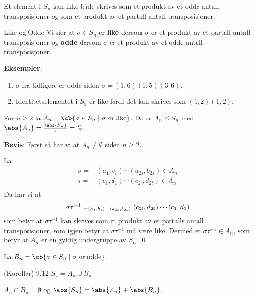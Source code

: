 \begin{theorem*}{9.15}{}
  Et element i $S_n$ kan ikke både skrives som et produkt av et odde antall transposisjoner og
  som et produkt av et partall antall transposisjoner.
\end{theorem*}

\begin{definition}{Like og Odde}{}
  Vi sier at $\sigma\in S_n$ er \textbf{like} dersom $\sigma$ er et produkt av et partall antall
  transposisjoner og \textbf{odde} dersom $\sigma$ er et produkt av et odde antall transposisjoner.
\end{definition}

\textbf{Eksempler}:
\begin{enumerate}
  \item $\sigma$ fra tidligere er odde siden $\sigma=(1,6)(1,5)(3,6)$.
  \item Identitetselementet i $S_n$ er like fordi det kan skrives som $(1,2)(1,2)$.
\end{enumerate}

\begin{theorem*}{9.20}{}
  For $n\geq 2$ la $A_n=\cb{\sigma\in S_n\mid\sigma\text{ er like}}$. Da er $A_n\leq S_n$ med
  $\abs{A_n}=\frac{\abs{S_n}}{2}=\frac{n!}{2}$.
\end{theorem*}

\textbf{Bevis}: Først så har vi at $A_n\neq\emptyset$ siden $n\geq 2$.

La 
\begin{align}
  \sigma=&(a_1,b_1)\cdots(a_{2s},b_{2s})\in A_n \\
  \tau=&(c_1,d_1)\cdots(c_{2t},d_{2t})\in A_n \\
\end{align}
Da har vi at
\begin{align}
  \sigma\tau^{-1}=\sb{(a_1,b_1)\cdots(a_{2s},b_{2s})}(c_{2t},d_{2t})\cdots(c_1,d_1)
\end{align}
som betyr at $\sigma\tau^{-1}$ kan skrives som et produkt av et partalls antall transposisjoner,
som igjen betyr at $\sigma\tau^{-1}$ må være like. Dermed er $\sigma\tau^{-1}\in A_n$, som
betyr at $A_n$ er en gyldig undergruppe av $S_n$. \qed

La $B_n=\cb{\sigma\in S_n\mid\sigma\text{ er odde}}$.

\begin{theorem*}{(Korollar) 9.12}{}
  $S_n=A_n\cup B_n$ 
\end{theorem*}

\begin{theorem*}{9.15}{}
  $A_n\cap B_n=\emptyset$ og $\abs{S_n}=\abs{A_n}+\abs{B_n}$. 
\end{theorem*}
